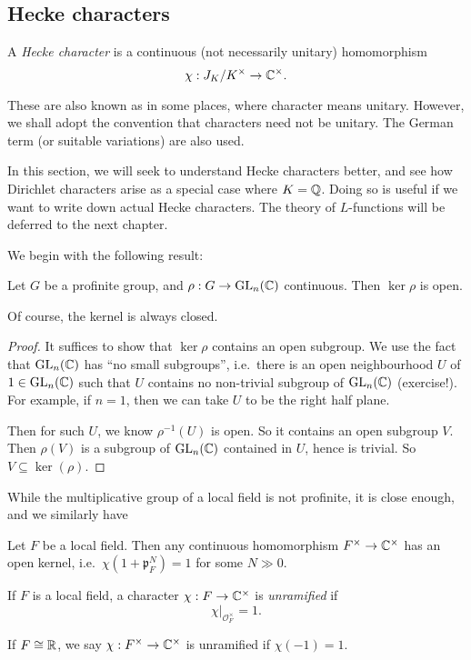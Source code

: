 \documentclass[a4paper]{article}
\begin{document}
\subsection{Hecke characters}
\begin{defi}
  A \emph{Hecke character} is a continuous (not necessarily unitary) homomorphism
  \[
    \chi: J_K/K^\times \to \mathbb{C}^\times.
  \]
\end{defi}
These are also known as  in some places, where character means unitary. However, we shall adopt the convention that characters need not be unitary. The German term  (or suitable variations) are also used.

In this section, we will seek to understand Hecke characters better, and see how Dirichlet characters arise as a special case where $K = \mathbb{Q}$. Doing so is useful if we want to write down actual Hecke characters. The theory of $L$-functions will be deferred to the next chapter.

We begin with the following result:
\begin{prop}
  Let $G$ be a profinite group, and $\rho: G \to \mathrm{GL}_n(\mathbb{C})$ continuous. Then $\ker \rho$ is open.
\end{prop}
Of course, the kernel is always closed.

\begin{proof}
  It suffices to show that $\ker \rho$ contains an open subgroup. We use the fact that $\mathrm{GL}_n(\mathbb{C})$ has ``no small subgroups'', i.e.\ there is an open neighbourhood $U$ of $1 \in \mathrm{GL}_n(\mathbb{C})$ such that $U$ contains no non-trivial subgroup of $\mathrm{GL}_n(\mathbb{C})$ (exercise!). For example, if $n = 1$, then we can take $U$ to be the right half plane.

  Then for such $U$, we know $\rho^{-1}(U)$ is open. So it contains an open subgroup $V$. Then $\rho(V)$ is a subgroup of $\mathrm{GL}_n(\mathbb{C})$ contained in $U$, hence is trivial. So $V \subseteq \ker (\rho)$.
\end{proof}

While the multiplicative group of a local field is not profinite, it is close enough, and we similarly have
\begin{ex}
  Let $F$ be a local field. Then any continuous homomorphism $F^\times \to \mathbb{C}^\times$ has an open kernel, i.e.\ $\chi(1 + \mathfrak{p}_F^N) = 1$ for some $N \gg 0$.
\end{ex}

\begin{defi}
  If $F$ is a local field, a character $\chi: F \to \mathbb{C}^\times$ is \emph{unramified} if
  \[
    \chi|_{\mathcal{O}_F^\times} = 1.
  \]

  If $F \cong \mathbb{R}$, we say $\chi: F^\times \to \mathbb{C}^\times$ is unramified if $\chi(-1) = 1$.
\end{defi}
\end{document}
